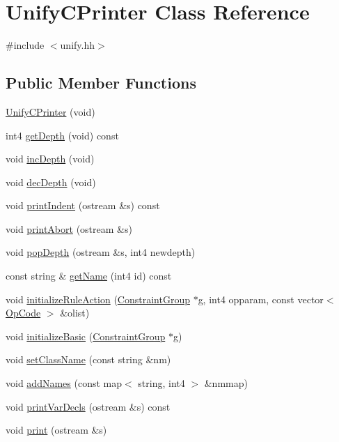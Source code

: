 \hypertarget{class_unify_c_printer}{}\section{Unify\+C\+Printer Class Reference}
\label{class_unify_c_printer}


{\ttfamily \#include $<$unify.\+hh$>$}

\subsection*{Public Member Functions}
\begin{DoxyCompactItemize}
\item 
\mbox{\hyperlink{class_unify_c_printer_accbb06496e0f3a34e247b8881062ddac}{Unify\+C\+Printer}} (void)
\item 
int4 \mbox{\hyperlink{class_unify_c_printer_a0d3dd056d885f2a7f507f1473df176cf}{get\+Depth}} (void) const
\item 
void \mbox{\hyperlink{class_unify_c_printer_a0fc6c098938a6d1117334db2367c3241}{inc\+Depth}} (void)
\item 
void \mbox{\hyperlink{class_unify_c_printer_a62f5f9405bdb9590cf769be7d783590a}{dec\+Depth}} (void)
\item 
void \mbox{\hyperlink{class_unify_c_printer_a01ff1a304fc8fc485051c32a3fa4d9f2}{print\+Indent}} (ostream \&s) const
\item 
void \mbox{\hyperlink{class_unify_c_printer_a7caa6dcc87c513c27efb207802f796ec}{print\+Abort}} (ostream \&s)
\item 
void \mbox{\hyperlink{class_unify_c_printer_a7b857ab2356b747c7feacd1689b1c55f}{pop\+Depth}} (ostream \&s, int4 newdepth)
\item 
const string \& \mbox{\hyperlink{class_unify_c_printer_ac85d475e36aad222fc9a96402665475f}{get\+Name}} (int4 id) const
\item 
void \mbox{\hyperlink{class_unify_c_printer_aa2d508fde49b53869962668873ddbad6}{initialize\+Rule\+Action}} (\mbox{\hyperlink{class_constraint_group}{Constraint\+Group}} $\ast$g, int4 opparam, const vector$<$ \mbox{\hyperlink{opcodes_8hh_abeb7dfb0e9e2b3114e240a405d046ea7}{Op\+Code}} $>$ \&olist)
\item 
void \mbox{\hyperlink{class_unify_c_printer_a1f7472c787e9b2ca04984613bf8672c6}{initialize\+Basic}} (\mbox{\hyperlink{class_constraint_group}{Constraint\+Group}} $\ast$g)
\item 
void \mbox{\hyperlink{class_unify_c_printer_a8ec5199aa1c272ec6f0b14f2606637b0}{set\+Class\+Name}} (const string \&nm)
\item 
void \mbox{\hyperlink{class_unify_c_printer_a15e995edbb7a6627d5cb27d873cbe700}{add\+Names}} (const map$<$ string, int4 $>$ \&nmmap)
\item 
void \mbox{\hyperlink{class_unify_c_printer_ad816ef381ccbaf0b61c6e09f29ba9871}{print\+Var\+Decls}} (ostream \&s) const
\item 
void \mbox{\hyperlink{class_unify_c_printer_a34b8c2c8d93a25592a7479de160b6733}{print}} (ostream \&s)
\end{DoxyCompactItemize}


